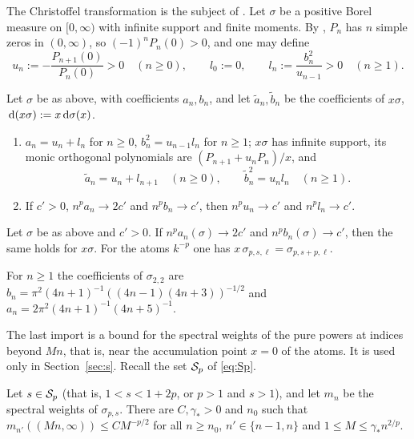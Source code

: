 The Christoffel transformation is the subject of \cite[Section~3]{PaperII}. Let $\sigma$ be a positive Borel measure
on $[0,\infty)$ with infinite support and finite moments. By \cite[Lemma~3.2]{PaperII}, $P_n$ has $n$ simple zeros in
$(0,\infty)$, so $(-1)^nP_n(0)>0$, and one may define
\begin{equation}\label{eq:chain}
  u_n:=-\frac{P_{n+1}(0)}{P_n(0)}>0\quad(n\ge0),\qquad l_0:=0,\qquad l_n:=\frac{b_n^2}{u_{n-1}}>0\quad(n\ge1).
\end{equation}

\begin{lemma}\label{lem:imp-chain}
Let $\sigma$ be as above, with coefficients $a_n,b_n$, and let $\tilde a_n,\tilde b_n$ be the coefficients of
$x\sigma$, $\,\mathrm{d}(x\sigma):=x\,\mathrm{d}\sigma(x)$.
\begin{enumerate}
\item[\textup{(i)}] $a_n=u_n+l_n$ for $n\ge0$, $b_n^2=u_{n-1}l_n$ for $n\ge1$; $x\sigma$ has infinite support, its
  monic orthogonal polynomials are $(P_{n+1}+u_nP_n)/x$, and
  \[
    \tilde a_n=u_n+l_{n+1}\quad(n\ge0),\qquad\tilde b_n^2=u_nl_n\quad(n\ge1).
  \]
\item[\textup{(ii)}] If $c'>0$, $n^pa_n\to2c'$ and $n^pb_n\to c'$, then $n^pu_n\to c'$ and $n^pl_n\to c'$.
\end{enumerate}
\end{lemma}

\begin{theorem}\label{thm:imp-shift}
Let $\sigma$ be as above and $c'>0$. If $n^pa_n(\sigma)\to2c'$ and $n^pb_n(\sigma)\to c'$, then the same holds for
$x\sigma$. For the atoms $k^{-p}$ one has $x\,\sigma_{p,s,\ell}=\sigma_{p,s+p,\ell}$.
\end{theorem}

\begin{proposition}\label{prop:imp-lommel}
For $n\ge1$ the coefficients of $\sigma_{2,2}$ are $b_n=\pi^2(4n+1)^{-1}((4n-1)(4n+3))^{-1/2}$ and
$a_n=2\pi^2(4n+1)^{-1}(4n+5)^{-1}$.
\end{proposition}

The last import is a bound for the spectral weights of the pure powers at indices beyond $Mn$, that is, near the
accumulation point $x=0$ of the atoms. It is used only in Section~\ref{sec:s}. Recall the set $\mathcal{S}_p$ of
\eqref{eq:Sp}.

\begin{proposition}[\tailbound]\label{prop:imp-tail}
Let $s\in\mathcal{S}_p$ \textup{(}that is, $1<s<1+2p$, or $p>1$ and $s>1$\textup{)}, and let $m_n$ be the spectral weights of
$\sigma_{p,s}$. There are $C,\gamma_*>0$ and $n_0$ such that $m_{n'}((Mn,\infty))\le CM^{-p/2}$ for all $n\ge n_0$,
$n'\in\{n-1,n\}$ and $1\le M\le\gamma_*n^{2/p}$.
\end{proposition}

